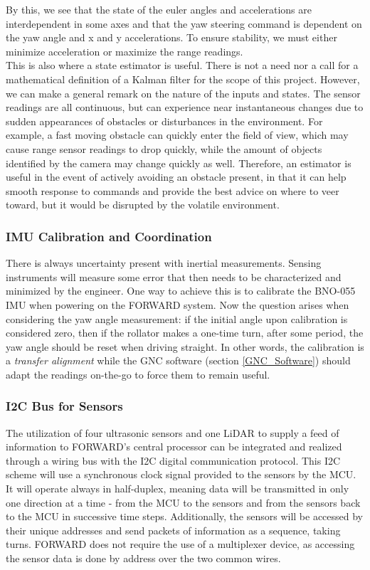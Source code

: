 \noindent By this, we see that the state of the euler angles and accelerations are interdependent in some axes and that the yaw steering command is dependent on the yaw angle and x and y accelerations. To ensure stability, we must either minimize acceleration or maximize the range readings.\\

\noindent This is also where a state estimator is useful. There is not a need nor a call for a mathematical definition of a Kalman filter for the scope of this project. However, we can make a general remark on the nature of the inputs and states. The sensor readings are all continuous, but can experience near instantaneous changes due to sudden appearances of obstacles or disturbances in the environment. For example, a fast moving obstacle can quickly enter the field of view, which may cause range sensor readings to drop quickly, while the amount of objects identified by the camera may change quickly as well. Therefore, an estimator is useful in the event of actively avoiding an obstacle present, in that it can help smooth response to commands and provide the best advice on where to veer toward, but it would be disrupted by the volatile environment.\\

\subsubsection{IMU Calibration and Coordination}
\noindent There is always uncertainty present with inertial measurements. Sensing instruments will measure some error that then needs to be characterized and minimized by the engineer. One way to achieve this is to calibrate the BNO-055 IMU when powering on the FORWARD system. Now the question arises when considering the yaw angle measurement: if the initial angle upon calibration is considered zero, then if the rollator makes a one-time turn, after some period, the yaw angle should be reset when driving straight. In other words, the calibration is a \textit{transfer alignment} while the GNC software (section \ref{GNC_Software}) should adapt the readings on-the-go to force them to remain useful.\\

\subsubsection{I2C Bus for Sensors}
\noindent The utilization of four ultrasonic sensors and one LiDAR to supply a feed of information to FORWARD's central processor can be integrated and realized through a wiring bus with the I2C digital communication protocol. This I2C scheme will use a synchronous clock signal provided to the sensors by the MCU. It will operate always in half-duplex, meaning data will be transmitted in only one direction at a time - from the MCU to the sensors and from the sensors back to the MCU in successive time steps. Additionally, the sensors will be accessed by their unique addresses and send packets of information as a sequence, taking turns. FORWARD does not require the use of a multiplexer device, as accessing the sensor data is done by address over the two common wires.